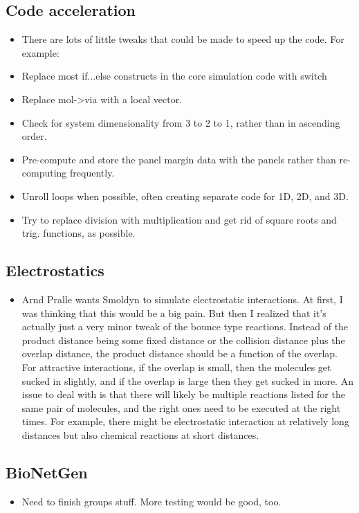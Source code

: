 \documentclass {scrbook}
\begin{document}
\subsection{Code acceleration}
\begin{itemize}
\item There are lots of little tweaks that could be made to speed up the code. For example:
\item Replace most if...else constructs in the core simulation code with switch
\item Replace mol->via with a local vector.
\item Check for system dimensionality from 3 to 2 to 1, rather than in ascending order.
\item Pre-compute and store the panel margin data with the panels rather than re-computing frequently.
\item Unroll loops when possible, often creating separate code for 1D, 2D, and 3D.
\item Try to replace division with multiplication and get rid of square roots and trig. functions, as possible.
\end{itemize}

\subsection{Electrostatics}
\begin{itemize}
\item Arnd Pralle wants Smoldyn to simulate electrostatic interactions. At first, I was thinking that this would be a big pain. But then I realized that it's actually just a very minor tweak of the bounce type reactions. Instead of the product distance being some fixed distance or the collision distance plus the overlap distance, the product distance should be a function of the overlap. For attractive interactions, if the overlap is small, then the molecules get sucked in slightly, and if the overlap is large then they get sucked in more. An issue to deal with is that there will likely be multiple reactions listed for the same pair of molecules, and the right ones need to be executed at the right times. For example, there might be electrostatic interaction at relatively long distances but also chemical reactions at short distances.
\end{itemize}

\subsection{BioNetGen}
\begin{itemize}
\item Need to finish groups stuff. More testing would be good, too.
\end{itemize}
\end{document}
